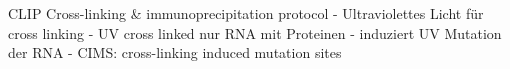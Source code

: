 CLIP\: Cross-linking \& immunoprecipitation protocol
- Ultraviolettes Licht für cross linking
- UV cross linked nur RNA mit Proteinen
- induziert UV Mutation der RNA
- CIMS: cross-linking induced mutation sites